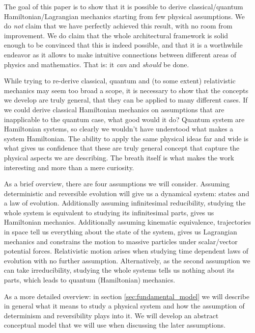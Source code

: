 \documentclass[aps,pra,10pt,twocolumn,floatfix,nofootinbib]{revtex4-1}
\numberwithin{equation}{section}
\theoremstyle{definition}
\begin{document}
The goal of this paper is to show that it is possible to derive classical/quantum Hamiltonian/Lagrangian mechanics starting from few physical assumptions. We do \emph{not} claim that we have perfectly achieved this result, with no room from improvement. We do claim that the whole architectural framework is solid enough to be convinced that this is indeed possible, and that it is a worthwhile endeavor as it allows to make intuitive connections between different areas of physics and mathematics. That is: it \emph{can} and \emph{should} be done.

While trying to re-derive classical, quantum and (to some extent) relativistic mechanics may seem too broad a scope, it is necessary to show that the concepts we develop are truly general, that they can be applied to many different cases. If we could derive classical Hamiltonian mechanics on assumptions that are inapplicable to the quantum case, what good would it do? Quantum system are Hamiltonian systems, so clearly we wouldn't have understood what makes a system Hamiltonian. The ability to apply the same physical ideas far and wide is what gives us confidence that these are truly general concept that capture the physical aspects we are describing. The breath itself is what makes the work interesting and more than a mere curiosity.

As a brief overview, there are four assumptions we will consider. Assuming deterministic and reversible evolution will give us a dynamical system: states and a law of evolution. Additionally assuming infinitesimal reducibility, studying the whole system is equivalent to studying its infinitesimal parts, gives us Hamiltonian mechanics. Additionally assuming kinematic equivalence, trajectories in space tell us everything about the state of the system, gives us Lagrangian mechanics and constrains the motion to massive particles under scalar/vector potential forces. Relativistic motion arises when studying time dependent laws of evolution with no further assumption. Alternatively, as the second assumption we can take irreducibility, studying the whole systems tells us nothing about its parts, which leads to quantum (Hamiltonian) mechanics.

As a more detailed overview: in section \ref{sec:fundamental_model} we will describe in general what it means to study a physical system and how the assumption of determinism and reversibility plays into it. We will develop an abstract conceptual model that we will use when discussing the later assumptions.
\end{document}
